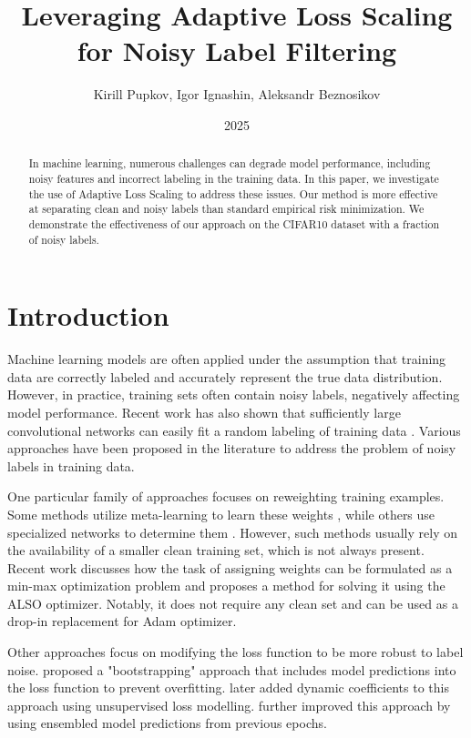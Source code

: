 \documentclass[12pt]{article}
\title{Leveraging Adaptive Loss Scaling for Noisy Label Filtering}
\author{Kirill Pupkov, Igor Ignashin, Aleksandr Beznosikov}
\date{2025}
\begin{document}
\maketitle

\begin{abstract}

    In machine learning, numerous challenges can degrade model performance, including noisy features and incorrect labeling in the training data. In this paper, we investigate the use of Adaptive Loss Scaling to address these issues. Our method is more effective at separating clean and noisy labels than standard empirical risk minimization. We demonstrate the effectiveness of our approach on the CIFAR10 dataset with a fraction of noisy labels.

\end{abstract}

\section{Introduction}

Machine learning models are often applied under the assumption that training data are correctly labeled and accurately represent the true data distribution. However, in practice, training sets often contain noisy labels, negatively affecting model performance. Recent work has also shown that sufficiently large convolutional networks can easily fit a random labeling of training data \citep{zhang2017understanding}. Various approaches have been proposed in the literature to address the problem of noisy labels in training data.

One particular family of approaches focuses on reweighting training examples. Some methods utilize meta-learning to learn these weights \citep{ren2018learning}, while others use specialized networks to determine them \citep{jiang2018mentornet}. However, such methods usually rely on the availability of a smaller clean training set, which is not always present. Recent work \citep{also} discusses how the task of assigning weights can be formulated as a min-max optimization problem and proposes a method for solving it using the ALSO optimizer. Notably, it does not require any clean set and can be used as a drop-in replacement for Adam \citep{kingma2014adam} optimizer.

Other approaches focus on modifying the loss function to be more robust to label noise. \citet{bootstrap} proposed a "bootstrapping" approach that includes model predictions into the loss function to prevent overfitting. \citet{UnsupervisedLabelNoise} later added dynamic coefficients to this approach using unsupervised loss modelling. \citet{selc} further improved this approach by using ensembled model predictions from previous epochs. 
\end{document}
